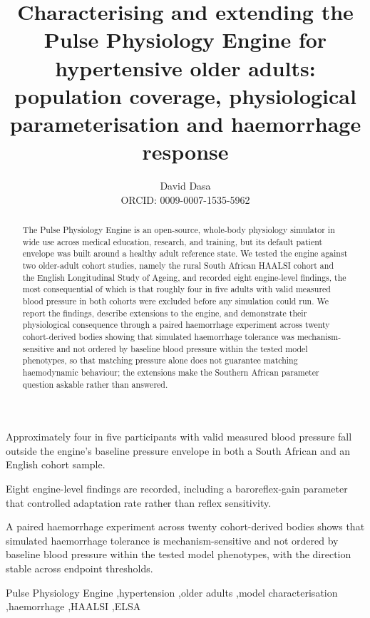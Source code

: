 \documentclass[preprint,12pt,nopreprintline]{elsarticle}
\begin{document}
\begin{frontmatter}

\title{Characterising and extending the Pulse Physiology Engine for hypertensive older adults: population coverage, physiological parameterisation and haemorrhage response}

\author{David Dasa\\[2pt]{\small ORCID: 0009-0007-1535-5962}}


\begin{abstract}
The Pulse Physiology Engine is an open-source, whole-body physiology simulator in wide use across medical education, research, and training, but its default patient envelope was built around a healthy adult reference state. We tested the engine against two older-adult cohort studies, namely the rural South African HAALSI cohort and the English Longitudinal Study of Ageing, and recorded eight engine-level findings, the most consequential of which is that roughly four in five adults with valid measured blood pressure in both cohorts were excluded before any simulation could run. We report the findings, describe extensions to the engine, and demonstrate their physiological consequence through a paired haemorrhage experiment across twenty cohort-derived bodies showing that simulated haemorrhage tolerance was mechanism-sensitive and not ordered by baseline blood pressure within the tested model phenotypes, so that matching pressure alone does not guarantee matching haemodynamic behaviour; the extensions make the Southern African parameter question askable rather than answered.
\end{abstract}

\begin{highlights}
\item Approximately four in five participants with valid measured blood pressure fall outside the engine's baseline pressure envelope in both a South African and an English cohort sample.
\item Eight engine-level findings are recorded, including a baroreflex-gain parameter that controlled adaptation rate rather than reflex sensitivity.
\item A paired haemorrhage experiment across twenty cohort-derived bodies shows that simulated haemorrhage tolerance is mechanism-sensitive and not ordered by baseline blood pressure within the tested model phenotypes, with the direction stable across endpoint thresholds.
\end{highlights}

\begin{keyword}
Pulse Physiology Engine \sep hypertension \sep older adults \sep model characterisation \sep haemorrhage \sep HAALSI \sep ELSA
\end{keyword}

\end{frontmatter}
\end{document}
